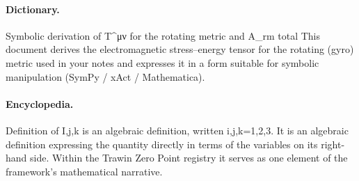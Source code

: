 \paragraph{Dictionary.}
Symbolic derivation of T\textasciicircum{}μν for the rotating metric and A\_rm total This document derives the electromagnetic stress–energy tensor for the rotating (gyro) metric used in your notes and expresses it in a form suitable for symbolic manipulation (SymPy / xAct / Mathematica).

\paragraph{Encyclopedia.}
Definition of I,j,k is an algebraic definition, written i,j,k=1,2,3. It is an algebraic definition expressing the quantity directly in terms of the variables on its right-hand side. Within the Trawin Zero Point registry it serves as one element of the framework's mathematical narrative.
